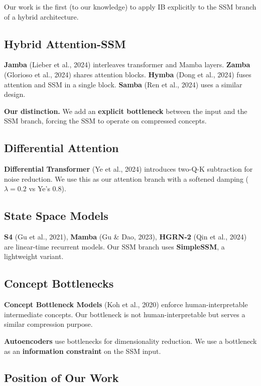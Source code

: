 Our work is the first (to our knowledge) to apply IB explicitly to the SSM 
branch of a hybrid architecture.

\subsection{Hybrid Attention-SSM}

\textbf{Jamba} (Lieber et al., 2024) interleaves transformer and Mamba layers. 
\textbf{Zamba} (Glorioso et al., 2024) shares attention blocks. \textbf{Hymba} (Dong 
et al., 2024) fuses attention and SSM in a single block. \textbf{Samba} (Ren et 
al., 2024) uses a similar design.

\textbf{Our distinction.} We add an \textbf{explicit bottleneck} between the input 
and the SSM branch, forcing the SSM to operate on compressed concepts.

\subsection{Differential Attention}

\textbf{Differential Transformer} (Ye et al., 2024) introduces two-Q-K 
subtraction for noise reduction. We use this as our attention branch with 
a softened damping ($\lambda = 0.2$ vs Ye's $0.8$).

\subsection{State Space Models}

\textbf{S4} (Gu et al., 2021), \textbf{Mamba} (Gu \& Dao, 2023), \textbf{HGRN-2} (Qin et 
al., 2024) are linear-time recurrent models. Our SSM branch uses 
\textbf{SimpleSSM}, a lightweight variant.

\subsection{Concept Bottlenecks}

\textbf{Concept Bottleneck Models} (Koh et al., 2020) enforce human-interpretable 
intermediate concepts. Our bottleneck is not human-interpretable but 
serves a similar compression purpose.

\textbf{Autoencoders} use bottlenecks for dimensionality reduction. We use a 
bottleneck as an \textbf{information constraint} on the SSM input.

\subsection{Position of Our Work}

